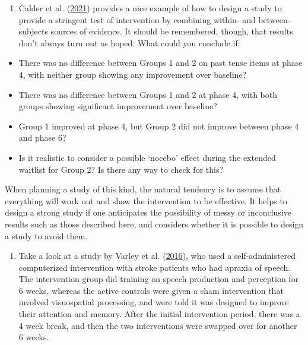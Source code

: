 \documentclass{krantz}
\providecommand{\tightlist}{%
\setlength{\itemsep}{0pt}\setlength{\parskip}{0pt}}
\begin{document}
\begin{enumerate}
\def\labelenumi{\arabic{enumi}.}
\tightlist
\item
  Calder et al. (\protect\hyperlink{ref-calder2021}{2021}) provides a nice example of how to design a study to provide a stringent test of intervention by combining within- and between-subjects sources of evidence. It should be remembered, though, that results don't always turn out as hoped. What could you conclude if:
\end{enumerate}

\begin{itemize}
\tightlist
\item
  There was no difference between Groups 1 and 2 on past tense items at phase 4, with neither group showing any improvement over baseline?\\
\item
  There was no difference between Groups 1 and 2 at phase 4, with both groups showing significant improvement over baseline?\\
\item
  Group 1 improved at phase 4, but Group 2 did not improve between phase 4 and phase 6?\\
\item
  Is it realistic to consider a possible `nocebo' effect during the extended waitlist for Group 2? Is there any way to check for this?
\end{itemize}

When planning a study of this kind, the natural tendency is to assume that everything will work out and show the intervention to be effective. It helps to design a strong study if one anticipates the possibility of messy or inconclusive results such as those described here, and considers whether it is possible to design a study to avoid them.

\begin{enumerate}
\def\labelenumi{\arabic{enumi}.}
\setcounter{enumi}{1}
\tightlist
\item
  Take a look at a study by Varley et al. (\protect\hyperlink{ref-varley2016}{2016}), who used a self-administered computerized intervention with stroke patients who had apraxia of speech. The intervention group did training on speech production and perception for 6 weeks, whereas the active controls were given a sham intervention that involved visuospatial processing, and were told it was designed to improve their attention and memory. After the initial intervention period, there was a 4 week break, and then the two interventions were swapped over for another 6 weeks.
\end{enumerate}
\end{document}
